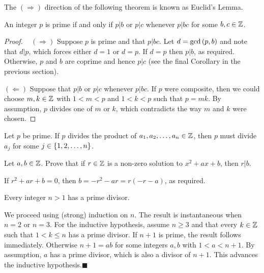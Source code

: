 \documentclass[11pt,fleqn,dvipsnames,usenames]{article}
\newcommand{\p}{\noindent}
\newcommand{\ENDPRF}{\hfill $\blacksquare$}
\begin{document}
\p The $(\Rightarrow)$ direction of the following theorem is known as Euclid's Lemma.
\vsp

\begin{theorem}\label{euclidslemma}
An integer $p$ is prime if and only if $p|b$ or $p|c$ whenever $p|bc$ for some $b,c\in\mathbb{Z}$.
\end{theorem}
%
\begin{proof}~
\p $(\Rightarrow)$ Suppose $p$ is prime and that $p|bc$.  Let $d = \text{gcd}\left(p,b\right)$ and note that $d|p$, which forces either $d = 1$ or $d = p$.  If $d = p$ then $p|b$, as required.  Otherwise, $p$ and $b$ are coprime and hence $p|c$ (see the final Corollary in the previous section).
\vsp

\p $(\Leftarrow)$ Suppose that $p|b$ or $p|c$ whenever $p|bc$.  If $p$ were composite, then we could choose $m,k\in\mathbb{Z}$ with $1 < m < p$ and $1 < k < p$ such that $p = mk$.  By assumption, $p$ divides one of $m$ or $k$, which contradicts the way $m$ and $k$ were chosen.
\end{proof}

\crlry Let $p$ be prime.  If $p$ divides the product of $a_{1},a_{2},\ldots, a_{n}\in\mathbb{Z}$, then $p$ must divide $a_{j}$ for some $j\in\left\{1,2,\ldots, n\right\}$.
\vsp

\begin{example}
Let $a,b\in\mathbb{Z}$.  Prove that if $r\in\mathbb{Z}$ is a non-zero solution to $x^2 + ax + b$, then $r|b$.
\end{example}

\solution If $r^2 + ar + b = 0$, then $b = -r^2 - ar = r(-r - a)$, as required.
\vsp

\lema Every integer $n > 1$ has a prime divisor.
\vsp

\prf We proceed using (strong) induction on $n$.  The result is instantaneous when $n=2$ or $n=3$.
For the inductive hypothesis, assume $n\geq 3$ and that every $k\in \mathbb{Z}$ such that $1 < k \leq n$ has a prime divisor.  If $n+1$ is prime, the result follows immediately.  Otherwise $n+1 = ab$ for some integers $a,b$ with $1 < a < n+1$.  By assumption, $a$ has a prime divisor, which is also a divisor of $n+1$.  This advances the inductive hypothesis.\ENDPRF
\vsp
\end{document}
